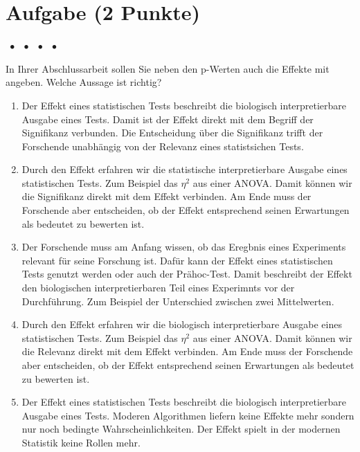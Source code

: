 \documentclass[a4paper, 9pt]{scrartcl}\usepackage[]{graphicx}\usepackage[]{xcolor}
\begin{document}
{\small

\section{Aufgabe \hfill (2 Punkte)}

\ifcollection
\begin{flushright}
\tiny\vspace{-2Ex}
\textbf{\examinhaltstart}
\exammodulemathstat $\;\bullet$
\exammodulestat $\;\bullet$
\exammodulestatbbv $\;\bullet$
\exammodulestatversuch $\;\bullet$
\exammodulebiostat
\vspace{-1Ex}
\end{flushright}
\fi




In Ihrer Abschlussarbeit sollen Sie neben den p-Werten auch die Effekte mit angeben. Welche Aussage ist richtig?



\begin{enumerate}
\item [\textbf{A} \msquare] Der Effekt eines statistischen Tests beschreibt die biologisch interpretierbare Ausgabe eines Tests. Damit ist der Effekt direkt mit dem Begriff der Signifikanz verbunden. Die Entscheidung über die Signifikanz trifft der Forschende unabhängig von der Relevanz eines statistsichen Tests.
\item [\textbf{B} \msquare] Durch den Effekt erfahren wir die statistische interpretierbare Ausgabe eines statistischen Tests. Zum Beispiel das $\eta^2$ aus einer ANOVA. Damit können wir die Signifikanz direkt mit dem Effekt verbinden. Am Ende muss der Forschende aber entscheiden, ob der Effekt entsprechend seinen Erwartungen als bedeutet zu bewerten ist.
\item [\textbf{C} \msquare] Der Forschende muss am Anfang wissen, ob das Eregbnis eines Experiments relevant für seine Forschung ist. Dafür kann der Effekt eines statistischen Tests genutzt werden oder auch der Prähoc-Test. Damit beschreibt der Effekt den biologischen interpretierbaren Teil eines Experimnts vor der Durchführung. Zum Beispiel der Unterschied zwischen zwei Mittelwerten.
\item [\textbf{D} \msquare] Durch den Effekt erfahren wir die biologisch interpretierbare Ausgabe eines statistischen Tests. Zum Beispiel das $\eta^2$ aus einer ANOVA. Damit können wir die Relevanz direkt mit dem Effekt verbinden. Am Ende muss der Forschende aber entscheiden, ob der Effekt entsprechend seinen Erwartungen als bedeutet zu bewerten ist.
\item [\textbf{E} \msquare] Der Effekt eines statistischen Tests beschreibt die biologisch interpretierbare Ausgabe eines Tests. Moderen Algorithmen liefern keine Effekte mehr sondern nur noch bedingte Wahrscheinlichkeiten. Der Effekt spielt in der modernen Statistik keine Rollen mehr.
\end{enumerate} 

}
\end{document}
